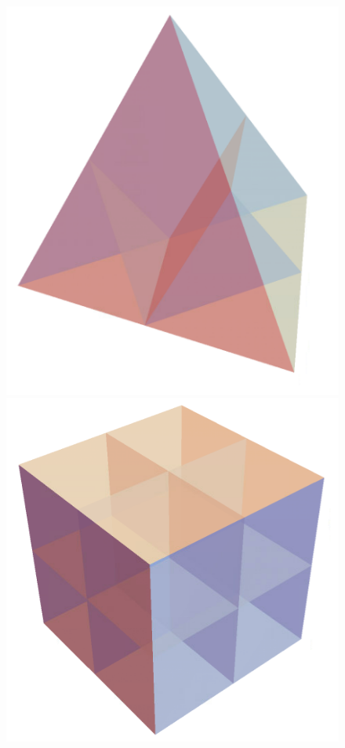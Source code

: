 \documentclass{amsart}
\theoremstyle{definition}
\begin{document}

\begin{figure}[p]
	\centerline{
		\includegraphics[scale=.3]{diagonalSimplexGuillaume.png}
		\includegraphics[scale=.35]{diagonalCubeGuillaume.png}
}
\end{figure}
\end{document}
